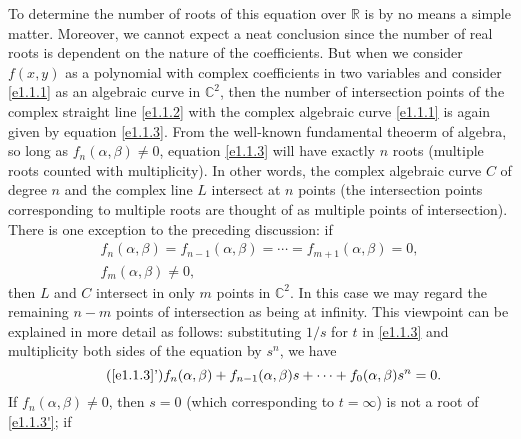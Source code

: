 \documentclass{book}
\def\R{\mathbb{R}}
\def\C{\mathbb{C}}
\begin{document}
    To determine the number of roots of this equation over $\R$ is by no means a simple matter. Moreover, we cannot expect a neat conclusion since the number of real roots is dependent on the nature of the coefficients. But when we consider $f(x,y)$ as a polynomial with complex coefficients in two variables and consider \eqref{e1.1.1} as an algebraic curve in $\C^2$, then the number of intersection points of the complex straight line \eqref{e1.1.2} with the complex algebraic curve \eqref{e1.1.1} is again given by equation \eqref{e1.1.3}. From the well-known fundamental theoerm of algebra, so long as $f_n(\alpha,\beta)\neq0$, equation \eqref{e1.1.3} will have exactly $n$ roots (multiple roots counted with multiplicity). In other words, the complex algebraic curve $C$ of degree $n$ and the complex line $L$ intersect at $n$ points (the intersection points corresponding to multiple roots are thought of as multiple points of intersection). There is one exception to the preceding discussion: if 
    \begin{gather*}
        f_n(\alpha,\beta)=f_{n-1}(\alpha,\beta)=\cdots=f_{m+1}(\alpha,\beta)=0, \\
        f_m(\alpha,\beta)\neq0, 
    \end{gather*}
    then $L$ and $C$ intersect in only $m$ points in $\C^2$. In this case we may regard the remaining $n-m$ points of intersection as being at infinity. This viewpoint can be explained in more detail as follows: substituting $1/s$ for $t$ in \eqref{e1.1.3} and multiplicity both sides of the equation by $s^n$, we have 
    \begin{equation}\label{e1.1.3'}\tag{\ref*{e1.1.3}'}
        f_n(\alpha,\beta)+f_{n-1}(\alpha,\beta)s+\cdots+f_0(\alpha,\beta)s^n=0. 
    \end{equation}
    If $f_n(\alpha,\beta)\neq0$, then $s=0$ (which corresponding to $t=\infty$) is not a root of \eqref{e1.1.3'}; if 
\end{document}
